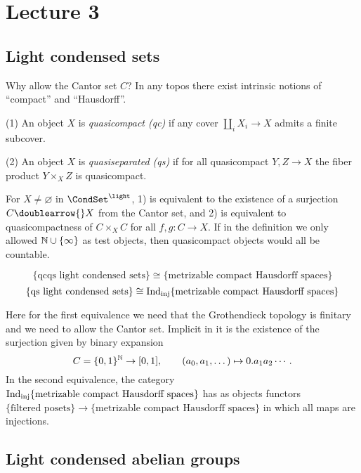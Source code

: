 \documentclass{notes}
\begin{document}
\section{Lecture 3}

\subsection{Light condensed sets}

Why allow the Cantor set $C$?
In any topos there exist intrinsic notions of ``compact'' and
``Hausdorff''. 

\begin{definition}
(1) An object $X$ is {\em quasicompact (qc)} if any cover $\amalg_iX_i\to X$
  admits a finite subcover.
  
(2) An object $X$ is {\em quasiseparated (qs)} if for all quasicompact
$Y,Z\to X$ the fiber product $Y\times_XZ$ is quasicompact. 
\end{definition}

\begin{remark}
For $X\neq\varnothing$ in $\CondSet^\light$, 1) is equivalent to the
existence of a surjection $C\doublearrow{}X$ from the Cantor set, and
2) is equivalent to quasicompactness of $C\times_XC$ for all $f,g:C\to X$. 
If in the definition we only allowed ${\mathbb{N}}\cup\{\infty\}$ as test
objects, then quasicompact objects would all be countable.
\end{remark}

\begin{prop}
$$
  \{\text{qcqs light condensed sets}\} \cong \{\text{metrizable compact
  Hausdorff spaces}\}
$$
$$
  \{\text{qs light condensed sets}\} \cong {\rm Ind}_{\rm inj}\{\text{metrizable compact
  Hausdorff spaces}\}
$$
\end{prop}

Here for the first equivalence we need that the Grothendieck topology
is finitary and we need to allow the Cantor set. Implicit in it is the
existence of the surjection given by binary expansion
$$
  C=\{0,1\}^{\mathbb{N}}\to[0,1],\qquad (a_0,a_1,\dots)\mapsto 0.a_1a_2\cdots.
$$
In the second equivalence, the category ${\rm Ind}_{\rm inj}\{\text{metrizable compact
  Hausdorff spaces}\}$ has as objects functors $\{\text{filtered posets}\}\to\{\text{metrizable compact
  Hausdorff spaces}\}$ in which all maps are injections.
  
\subsection{Light condensed abelian groups}
\end{document}
